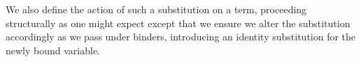 
We also define the action of such a substitution on a term, proceeding
structurally as one might expect except that we ensure we alter the
substitution accordingly as we pass under binders, introducing an identity
substitution for the newly bound variable.

